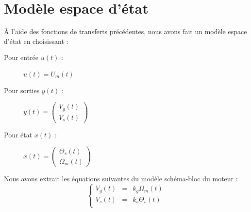 	\section{Modèle espace d'état}
À l'aide des fonctions de transferts précédentes, nous avons fait un modèle espace d'état en choisissant : \\
\begin{description}
\item[Pour entrée $u(t)$ :] $u(t) = U_m(t) $
\item[Pour sorties $y(t)$ :] $ y(t) = \begin{pmatrix}
V_g(t) \\
V_s(t)
\end{pmatrix}$
\item[Pour état $x(t)$ :] $x(t) = \begin{pmatrix}
\Theta_s(t)\\
\Omega_m(t)
\end{pmatrix}$
\end{description}
Nous avons extrait les équations suivantes du modèle schéma-bloc du moteur :
\begin{equation}
\label{eq:VsVgModel}
\left\lbrace
\begin{array}{lcl}
V_g(t) 	&=&		k_g \Omega_m(t)\\
V_s(t) 	&=&		k_s \Theta_s(t)\\
\end{array}
\right.
\end{equation}

